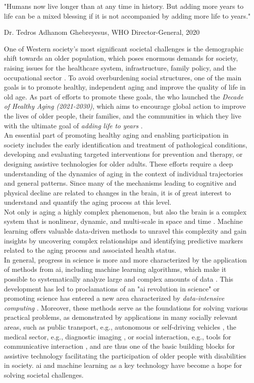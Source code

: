 \setlength{\epigraphwidth}{0.6\textwidth}
\epigraph{\centering "Humans now live longer than at any time in history. But adding more years to life can be a mixed blessing if it is not accompanied by adding more life to years."} {Dr. Tedros Adhanom Ghebreyesus, WHO Director-General, 2020}

\noindent One of Western society's most significant societal challenges is the demographic shift towards an older population, which poses enormous demands for society, raising issues for the healthcare system, infrastructure, family policy, and the occupational sector \cite{who_aging2023}. To avoid overburdening social structures, one of the main goals is to promote healthy, independent aging and improve the quality of life in old age. As part of efforts to promote these goals, the \gls{who} launched the \textit{Decade of Healthy Aging (2021-2030)}, which aims to encourage global action to improve the lives of older people, their families, and the communities in which they live with the ultimate goal of \textit{adding life to years} \cite{who_aging2023}.\\
An essential part of promoting healthy aging and enabling participation in society includes  the early identification and treatment of pathological conditions, developing and evaluating targeted interventions for prevention and therapy, or designing assistive technologies for older adults. These efforts require a deep understanding of the dynamics of aging in the context of individual trajectories and general patterns. Since many of the mechanisms leading to cognitive and physical decline are related to changes in the brain, it is of great interest to understand and quantify the aging process at this level.\\
Not only is aging a highly complex phenomenon, but also the brain is a complex system that is nonlinear, dynamic, and multi-scale in space and time \cite{Betzel2017}. Machine learning offers valuable data-driven methods to unravel this complexity and gain insights by uncovering complex relationships and identifying predictive markers related to the aging process and associated health status.\\
In general, progress in science is more and more characterized by the application of methods from \gls{ai}, including machine learning algorithms, which make it possible to systematically analyze large and complex amounts of data \cite{Brunton2019}. This development has led to proclamations of an "\gls{ai} revolution in science" \cite{Appenzeller2017} or promoting science has entered a new area characterized by \textit{data-intensive computing} \cite{Hey2009}. Moreover, these methods serve as the foundations for solving various practical problems, as demonstrated by applications in many socially relevant areas, such as public transport, e.g., autonomous or self-driving vehicles \cite{Leonard2020}, the medical sector, e.g., diagnostic imaging \cite{Liu2020}, or social interaction, e.g., tools for communicative interaction \cite{Adamopoulou2020}, and are thus one of the basic building blocks for assistive technology facilitating the participation of older people with disabilities in society. \Gls{ai} and machine learning as a key technology have become a hope for solving societal challenges.\\
